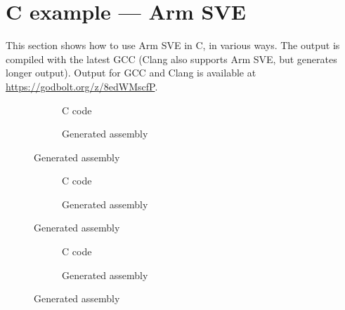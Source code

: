 \pagebreak
\section{C example --- Arm SVE}\label{example:armsvec}
This section shows how to use Arm SVE in C, in various ways.
The output is compiled with the latest GCC (Clang also supports Arm SVE, but generates longer output).
Output for GCC and Clang is available at \url{https://godbolt.org/z/8edWMscfP}.

\begin{figure}[h]
    \caption{Arm SVE --- Autovectorization}

    \centering
    \begin{subfigure}[t]{0.8\linewidth}
        \caption{C code}
    \end{subfigure}

    \vspace{1em}
    \begin{subfigure}[t]{0.8\linewidth}
        \caption{Generated assembly}
    \end{subfigure}
\end{figure}

\clearpage
\pagebreak

\begin{figure}[h]
    \caption{Arm SVE --- Intrinsics}

    \centering
    \begin{subfigure}[t]{0.8\linewidth}
        \caption{C code}
    \end{subfigure}

    \vspace{1em}
    \begin{subfigure}[t]{0.8\linewidth}
        \caption{Generated assembly}
    \end{subfigure}
\end{figure}

\clearpage
\pagebreak

\begin{figure}[h]
    \caption{Arm SVE --- Inline Assembly}

    \centering
    \begin{subfigure}[t]{\linewidth}
        \caption{C code}
    \end{subfigure}

    \vspace{1em}
    \begin{subfigure}[t]{0.8\linewidth}
        \caption{Generated assembly}
    \end{subfigure}
\end{figure}

